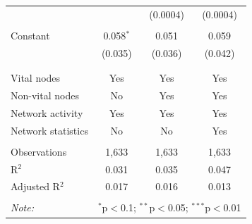 \begin{table}[!htbp]
\begin{tabular}{@{\extracolsep{5pt}}lccc}
  &  & (0.0004) & (0.0004) \\ 
  & & & \\ 
 Constant & 0.058$^{*}$ & 0.051 & 0.059 \\ 
  & (0.035) & (0.036) & (0.042) \\ 
  & & & \\ 
\hline \\[-1.8ex] 
Vital nodes & Yes & Yes & Yes \\ 
Non-vital nodes & No & Yes & Yes \\ 
Network activity & Yes & Yes & Yes \\ 
Network statistics & No & No & Yes \\ 
\hline &  &  &  \\ 
Observations & 1,633 & 1,633 & 1,633 \\ 
R$^{2}$ & 0.031 & 0.035 & 0.047 \\ 
Adjusted R$^{2}$ & 0.017 & 0.016 & 0.013 \\ 
\hline 
\hline \\[-1.8ex] 
\textit{Note:}  & \multicolumn{3}{r}{$^{*}$p$<$0.1; $^{**}$p$<$0.05; $^{***}$p$<$0.01} \\ 
\end{tabular} 
\end{table} 
